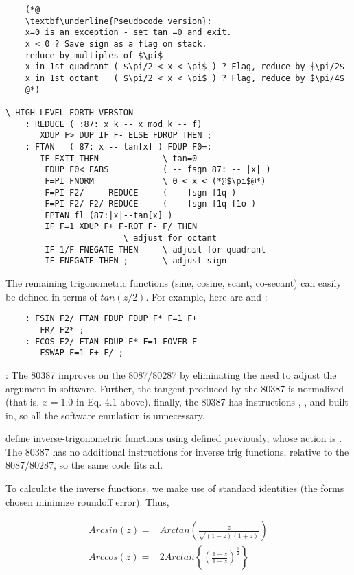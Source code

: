 \begin{lstlisting}
    (*@
    \textbf\underline{Pseudocode version}:
    x=0 is an exception - set tan =0 and exit.
    x < 0 ? Save sign as a flag on stack.
    reduce by multiples of $\pi$
    x in 1st quadrant ( $\pi/2 < x < \pi$ ) ? Flag, reduce by $\pi/2$
    x in 1st octant   ( $\pi/2 < x < \pi$ ) ? Flag, reduce by $\pi/4$
    @*)

\ HIGH LEVEL FORTH VERSION
    : REDUCE ( :87: x k -- x mod k -- f)
       XDUP F> DUP IF F- ELSE FDROP THEN ;
    : FTAN   ( 87: x -- tan[x] ) FDUP F0=:
       IF EXIT THEN             \ tan=0
        FDUP F0< FABS           ( -- fsgn 87: -- |x| )
        F=PI FNORM              \ 0 < x < (*@$\pi$@*)
        F=PI F2/     REDUCE     ( -- fsgn f1q )
        F=PI F2/ F2/ REDUCE     ( -- fsgn f1q f1o )
        FPTAN fl (87:|x|--tan[x] )
        IF F=1 XDUP F+ F-ROT F- F/ THEN
                        \ adjust for octant
        IF 1/F FNEGATE THEN     \ adjust for quadrant
        IF FNEGATE THEN ;       \ adjust sign
\end{lstlisting}

The remaining trigonometric functions (sine, cosine, scant, co-secant) can easily be defined in terms of $tan(z /2)$. For example, here are  and :

\begin{lstlisting}
    : FSIN F2/ FTAN FDUP FDUP F* F=1 F+
       FR/ F2* ;
    : FCOS F2/ FTAN FDUP F* F=1 FOVER F-
       FSWAP F=1 F+ F/ ;
\end{lstlisting}

\leftbar[1\linewidth]
\Note: The 80387 improves on the 8087/80287 by eliminating the
need to adjust the argument in software. Further, the tangent
produced by the 80387 is normalized (that is, $x = 1.0$ in Eq. 4.1
above). finally, the 80387 has instructions , , and  built in, so all the software emulation is unnecessary.
\endleftbar

 define inverse-trigonometric functions using  defined previously, whose action is . The 80387 has no additional instructions for inverse trig functions, relative to the 8087/80287, so the same code fits all.

To calculate the inverse functions, we make use of standard identities (the forms chosen minimize roundoff error). Thus,

\begin{align}
    Arcsin(z) =& Arctan\left(\frac{z}{\sqrt{(1-z)(1+z)}}\right) \\
    Arccos(z) =& 2 Arctan\left \{\left (\frac{1-z}{1+z}\right)^{\frac{1}{2}}\right \}
\end{align}

